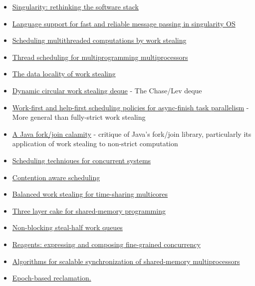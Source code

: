 \begin{itemize}
  \item{\href{https://research.microsoft.com/pubs/69431/osr2007\_rethinkingsoftwarestack.pdf}
          {Singularity: rethinking the software stack}}
  \item{\href{https://research.microsoft.com/pubs/67482/singsharp.pdf}
          {Language support for fast and reliable message passing in singularity OS}}
  \item{\href{http://supertech.csail.mit.edu/papers/steal.pdf}{Scheduling multithreaded computations by work stealing}}
  \item{\href{http://www.eecis.udel.edu/\%7Ecavazos/cisc879-spring2008/papers/arora98thread.pdf}
          {Thread scheduling for multiprogramming multiprocessors}}
  \item{\href{http://www.aladdin.cs.cmu.edu/papers/pdfs/y2000/locality\_spaa00.pdf}{The data locality of work stealing}}
  \item{\href{http://citeseerx.ist.psu.edu/viewdoc/download?doi=10.1.1.170.1097&rep=rep1&type=pdf}
          {Dynamic circular work stealing deque} - The Chase/Lev deque}
  \item{\href{http://www.cs.rice.edu/\%7Eyguo/pubs/PID824943.pdf}
          {Work-first and help-first scheduling policies for async-finish task parallelism} - More general than fully-strict 
          work stealing}
  \item{\href{http://www.coopsoft.com/ar/CalamityArticle.html}{A Java fork/join calamity} - critique of Java's fork/join 
          library, particularly its application of work stealing to non-strict computation}
  \item{\href{http://www.stanford.edu/\%7Eouster/cgi-bin/papers/coscheduling.pdf}{Scheduling techniques for concurrent systems}}
  \item{\href{http://www.blagodurov.net/files/a8-blagodurov.pdf}{Contention aware scheduling}}
  \item{\href{http://www.cse.ohio-state.edu/hpcs/WWW/HTML/publications/papers/TR-12-1.pdf}{Balanced work stealing for 
          time-sharing multicores}}
  \item{\href{http://dl.acm.org/citation.cfm?id=1953616&dl=ACM&coll=DL&CFID=524387192&CFTOKEN=44362705}{Three layer cake 
          for shared-memory programming}}
  \item{\href{http://www.cs.bgu.ac.il/\%7Ehendlerd/papers/p280-hendler.pdf}{Non-blocking steal-half work queues}}
  \item{\href{http://www.mpi-sws.org/\%7Eturon/reagents.pdf}{Reagents: expressing and composing fine-grained concurrency}}
  \item{\href{https://www.cs.rochester.edu/u/scott/papers/1991\_TOCS\_synch.pdf}{Algorithms for scalable synchronization of 
          shared-memory multiprocessors}}
  \item{\href{https://www.cl.cam.ac.uk/techreports/UCAM-CL-TR-579.pdf}{Epoch-based reclamation.}}
\end{itemize}

